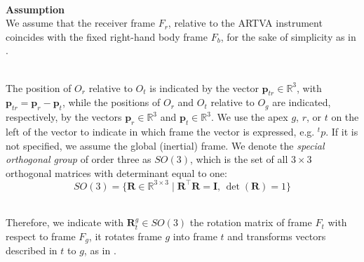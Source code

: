 \documentclass[main]{subfiles}
\begin{document}
\noindent\\
\textbf{Assumption}\noindent\\
We assume that the receiver frame $F_r$, relative to the ARTVA
instrument coincides with the fixed right-hand body frame $F_b$, for the sake of simplicity
as in \cite{similar-main}.

\noindent\\
The position of $O_r$ relative to $O_t$ is indicated by the vector $\mathbf{p}_{tr} \in \mathbb{R}^3$, with $\mathbf{p}_{tr} = \mathbf{p}_r - \mathbf{p}_t$, 
while the positions of $O_r$ and $O_t$ relative to $O_g$ are indicated, respectively, by the vectors $\mathbf{p}_r \in \mathbb{R}^3$ and $\mathbf{p}_t \in \mathbb{R}^3$.
We use the apex $g$, $r$, or $t$ on the left of the vector to indicate in which frame the vector is expressed, e.g. ${}^t p$. 
If it is not specified, we assume the global (inertial) frame.
We denote the \textit{special orthogonal group} of order three as \( \textit{SO}(3) \), 
which is the set of all \( 3 \times 3 \) orthogonal matrices with determinant equal to one:
\[
\textit{SO}(3) = \{ \mathbf{R} \in \mathbb{R}^{3 \times 3} \mid \mathbf{R}^\top \mathbf{R} = \mathbf{I}, \, \det(\mathbf{R}) = 1 \}
\]

\noindent\\
Therefore, we indicate with \( \mathbf{R}^g_t \in \textit{SO}(3) \) the rotation matrix of frame $F_t$ with respect to frame $F_g$,
it rotates frame \( g \) into frame \( t \) and transforms vectors described in $t$ to $g$, as in \cite{book-robotics}.

\end{document}
